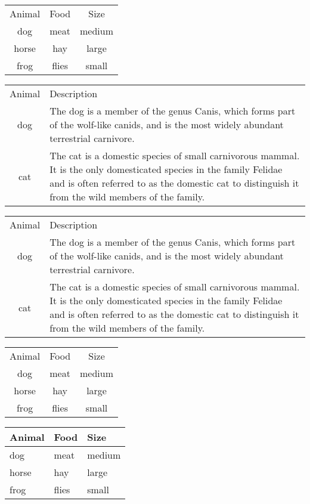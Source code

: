 \documentclass{article}
\begin{document}
	\begin{tabular}{ccc}
		Animal & Food  & Size   \\
		dog    & meat  & medium \\
		horse  & hay   & large  \\
		frog   & flies & small  \\
	\end{tabular}
	
	\begin{tabular}{cl}
		Animal & Description \\
		dog    & The dog is a member of the genus Canis, which forms part of the
		wolf-like canids, and is the most widely abundant terrestrial
		carnivore. \\
		cat    & The cat is a domestic species of small carnivorous mammal. It is the
		only domesticated species in the family Felidae and is often referred
		to as the domestic cat to distinguish it from the wild members of the
		family. \\
	\end{tabular}
	

	\begin{tabular}{cp{9cm}}
		Animal & Description \\
		dog    & The dog is a member of the genus Canis, which forms part of the
		wolf-like canids, and is the most widely abundant terrestrial
		carnivore. \\
		cat    & The cat is a domestic species of small carnivorous mammal. It is the
		only domesticated species in the family Felidae and is often referred
		to as the domestic cat to distinguish it from the wild members of the
		family. \\
	\end{tabular}
	
	\begin{tabular}{*{3}{c}}
		Animal & Food  & Size   \\
		dog    & meat  & medium \\
		horse  & hay   & large  \\
		frog   & flies & small  \\
	\end{tabular}
	
	

	\begin{tabular}{lll}
		\toprule
		Animal & Food  & Size   \\
		\midrule
		dog    & meat  & medium \\
		horse  & hay   & large  \\
		frog   & flies & small  \\
		\bottomrule
	\end{tabular}
	
\end{document}
